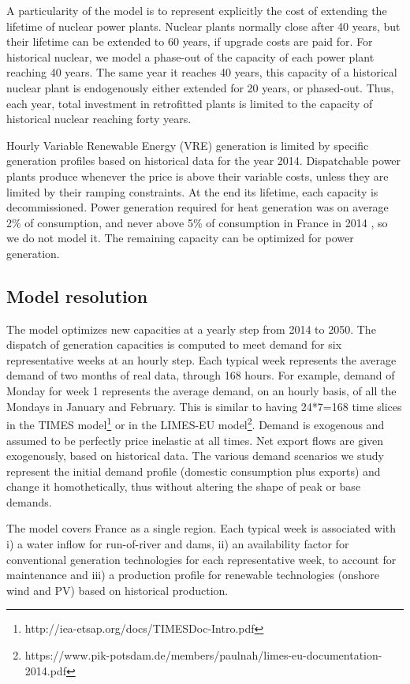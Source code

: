 A particularity of the model is to represent explicitly the cost of extending the lifetime of nuclear power plants.
Nuclear plants normally close after 40 years, but their lifetime can be extended to 60 years, if upgrade costs are paid for.
For historical nuclear, we model a phase-out of the capacity of each power plant reaching 40 years.
The same year it reaches 40 years, this capacity of a historical nuclear plant is endogenously either extended for 20 years, or phased-out. 
Thus, each year, total investment in retrofitted plants is limited to the capacity of historical nuclear reaching forty years.

Hourly Variable Renewable Energy (VRE) generation is limited by specific generation profiles based on historical data for the year 2014.
Dispatchable power plants produce whenever the price is above their variable costs, unless they are limited by their ramping constraints.
At the end its lifetime, each capacity is decommissioned.
Power generation required for heat generation was on average 2\% of consumption, and never above 5\% of consumption in France in 2014 \citep{RTE2014}, so we do not model it.
The remaining capacity can be optimized for power generation.

\subsection{Model resolution}

The model optimizes new capacities at a yearly step from 2014 to 2050. The dispatch of generation capacities is computed to meet demand for six representative weeks at an hourly step. Each typical week represents the average demand of two months of real data, through 168 hours. For example, demand of Monday for week 1 represents the average demand, on an hourly basis, of all the Mondays in January and February. This is similar to having 24*7=168 time slices in the TIMES model\footnote{http://iea-etsap.org/docs/TIMESDoc-Intro.pdf} or in the LIMES-EU model\footnote{https://www.pik-potsdam.de/members/paulnah/limes-eu-documentation-2014.pdf}.
Demand is exogenous and assumed to be perfectly price inelastic at all times. Net export flows are given exogenously, based on historical data. 
The various demand scenarios we study represent the initial demand profile (domestic consumption plus exports) and change it homothetically, thus without altering the shape of peak or base demands.

The model covers France as a single region.
Each typical week is associated with i) a water inflow for run-of-river and dams, ii) an availability factor for conventional generation technologies for each representative week, to account for maintenance and iii) a production profile for renewable technologies (onshore wind and PV) based on historical production.

